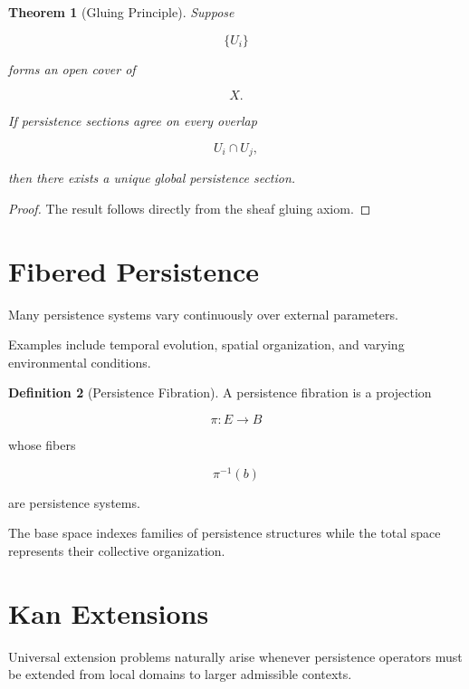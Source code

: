 \documentclass[11pt]{book}
\numberwithin{equation}{chapter}
\theoremstyle{definition}
\newtheorem{definition}{Definition}[chapter]
\theoremstyle{plain}
\newtheorem{theorem}[definition]{Theorem}
\begin{document}
\begin{theorem}[Gluing Principle]

Suppose

\[
\{U_i\}
\]

forms an open cover of

\[
X.
\]

If persistence sections agree on every overlap

\[
U_i
\cap
U_j,
\]

then there exists a unique global persistence section.

\end{theorem}

\begin{proof}

The result follows directly from the sheaf gluing axiom.

\end{proof}

\section{Fibered Persistence}

Many persistence systems vary continuously over external parameters.

Examples include temporal evolution, spatial organization, and varying
environmental conditions.

\begin{definition}[Persistence Fibration]

A persistence fibration is a projection

\[
\pi:
E
\rightarrow
B
\]

whose fibers

\[
\pi^{-1}(b)
\]

are persistence systems.

\end{definition}

The base space indexes families of persistence structures while the
total space represents their collective organization.

\section{Kan Extensions}

Universal extension problems naturally arise whenever persistence
operators must be extended from local domains to larger admissible
contexts.
\end{document}
